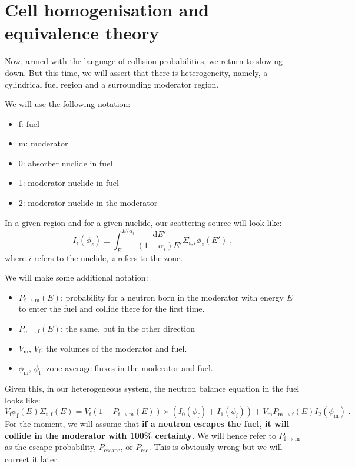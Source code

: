 \section{Cell homogenisation and equivalence theory}

Now, armed with the language of collision probabilities, we return to slowing down. But this time, we will assert that there is heterogeneity, namely, a cylindrical fuel region and a surrounding moderator region.

We will use the following notation:
\begin{itemize}
    \item f: fuel
    \item m: moderator
    \item 0: absorber nuclide in fuel
    \item 1: moderator nuclide in fuel
    \item 2: moderator nuclide in the moderator
\end{itemize}
In a given region and for a given nuclide, our scattering source will look like:
\begin{equation*}
    I_i(\phi_z) \equiv \int^{E/\alpha_i}_{E}\frac{\mathrm{d}E'}{(1-\alpha_i)E'}\Sigma_{\mathrm{s},i}\phi_z(E')\;\mathrm{,}
\end{equation*}
where $i$ refers to the nuclide, $z$ refers to the zone.

We will make some additional notation:
\begin{itemize}
    \item $P_{\mathrm{f}\rightarrow\mathrm{m}}(E)$: probability for a neutron born in the moderator with energy $E$ to enter the fuel and collide there for the first time.
    \item $P_{\mathrm{m}\rightarrow\mathrm{f}}(E)$: the same, but in the other direction
    \item $V_\mathrm{m}$, $V_\mathrm{f}$: the volumes of the moderator and fuel.
    \item $\phi_\mathrm{m}$, $\phi_\mathrm{f}$: zone average fluxes in the moderator and fuel.
\end{itemize}

Given this, in our heterogeneous system, the neutron balance equation in the fuel looks like:
\begin{equation*}
    V_\mathrm{f}\phi_\mathrm{f}(E)\Sigma_\mathrm{t,f}(E) = V_\mathrm{f}(1-P_{\mathrm{f}\rightarrow\mathrm{m}}(E))\times(I_0(\phi_\mathrm{f}) + I_1(\phi_\mathrm{f})) + V_\mathrm{m}P_{\mathrm{m}\rightarrow\mathrm{f}}(E)I_2(\phi_\mathrm{m})\;\mathrm{.}
\end{equation*}
For the moment, we will assume that \textbf{if a neutron escapes the fuel, it will collide in the moderator with 100\% certainty}. We will hence refer to $P_{\mathrm{f}\rightarrow\mathrm{m}}$ as the escape probability, $P_\mathrm{escape}$, or $P_\mathrm{esc}$. This is obviously wrong but we will correct it later.

